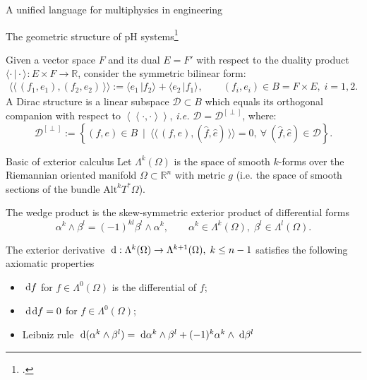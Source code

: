 \documentclass[aspectratio=169]{beamer}
\newcommand{\bbR}{\mathbb{R}}
\newcommand{\dualpr}[3][]{\ensuremath{\langle #2 \, \vert #3 \rangle_{#1}}}
\newcommand{\bilprod}[2]{\langle \langle \, #1, #2 \, \rangle \rangle}
\begin{document}
\begin{frame}{A unified language for multiphysics in engineering}
	
\end{frame}




\begin{frame}{The geometric structure of pH systems\footcite{courant1990}}
	\begin{definition}
		Given a vector space ${F}$ and its dual ${E}=F'$ with respect to the duality product $\dualpr{\cdot}{\cdot} : {E} \times {F} \rightarrow \mathbb{R}$, consider the symmetric bilinear form:
		$$
		\bilprod{({f}_1, {e}_1)}{({f}_2, {e}_2)} := {\dualpr{{e}_1}{{f}_2}} + {\dualpr{{e}_2}{{f}_1}}, \qquad ({f}_i, {e}_i) \in {B} = {F} \times {E}, \; i = 1, 2.
		$$
		A Dirac structure is a linear subspace $\mathcal{D} \subset {B}$ which equals its orthogonal companion with respect to $\left\langle \left\langle \cdot, \cdot \right\rangle \right\rangle$, {\it i.e.} $\mathcal{D} =\mathcal{D}^{[\perp]}$, where:
		$$
		\mathcal{D}^{[\perp]} := \left\{ ({f}, {e}) \in {B} ~ \mid ~ \bilprod{({f}, {e})}{(\widehat{{f}}, \widehat{{e}})} = 0, ~ \forall ~ (\widehat{{f}}, \widehat{{e}}) \in \mathcal{D} \right\}.
		$$
	\end{definition}


\end{frame}



\begin{frame}{Basic of exterior calculus}
Let $\Lambda^k(\Omega)$ is the space of smooth $k$-forms over the Riemannian oriented manifold $\Omega \subset \bbR^n$ with metric $g$ (i.e. the space of smooth sections of the bundle $\mathrm{Alt}^k T^* \Omega$).

\begin{definition}
The wedge product is the skew-symmetric exterior product of differential forms
\begin{equation*}
	\alpha^k \wedge \beta^l = (-1)^{kl} \beta^l \wedge \alpha^k,
	\qquad \alpha^k \in \Lambda^k(\Omega), \; \beta^l \in \Lambda^l(\Omega).
\end{equation*}
\end{definition}

\begin{definition}
The exterior derivative $\d:\Lambda^k(\Omega) \rightarrow \Lambda^{k+1}(\Omega), \; k\le n-1$ satisfies the following axiomatic properties
\begin{itemize}
	\item $\d f$ for $f \in \Lambda^0(\Omega)$ is the differential of $f$;
	\item $\d{}\d{} f = 0$ for $f \in \Lambda^0(\Omega)$;
	\item Leibniz rule $\d (\alpha^k \wedge \beta^l) = \d\alpha^k \wedge \beta^l + (-1)^k \alpha^k \wedge \d\beta^l$
\end{itemize}
\end{definition}



\end{frame}
\end{document}
